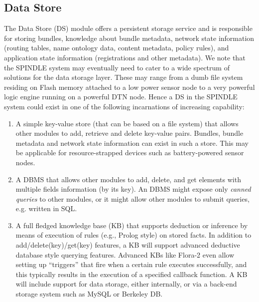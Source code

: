 \documentclass[11pt]{article}
\begin{document}
\subsection{Data Store}
\label{sec:ds}

The Data Store (DS) module offers a persistent storage service and is
responsible for storing bundles, knowledge about bundle metadata, network state
information (routing tables, name ontology data, content metadata, policy
rules), and application state information (registrations and other metadata).
We note that the SPINDLE system may eventually need to cater to a wide spectrum
of solutions for the data storage layer. These may range from a dumb file
system residing on Flash memory attached to a low power sensor node to a very
powerful logic engine running on a powerful DTN node.  Hence a DS in the
SPINDLE system could exist in one of the following incarnations of increasing
capability: 

\begin{enumerate}
\item A simple key-value store (that can be based on a file system) that allows 
other modules to add, retrieve and delete key-value pairs. Bundles, bundle metadata 
and network state information can exist in such a store. This may be 
applicable for resource-strapped devices such as battery-powered sensor 
nodes.

\item A DBMS that allows other modules to add, delete, and get
elements with multiple fields information (by its key). An DBMS might 
expose only {\it canned queries} to other modules, or it might allow other 
modules to submit queries, e.g. written in SQL.

\item A full fledged knowledge base (KB) that supports deduction or inference
by means of execution of rules (e.g., Prolog style) on stored facts. In
addition to add/delete(key)/get(key) features, a KB will support advanced
deductive database style querying features. Advanced KBs like Flora-2 even
allow setting up ``triggers'' that fire when a certain rule executes
successfully, and this typically results in the execution of a specified
callback function.  A KB will include support for data storage, either
internally, or via a back-end storage system such as MySQL or Berkeley DB.

\end{enumerate}
\end{document}
